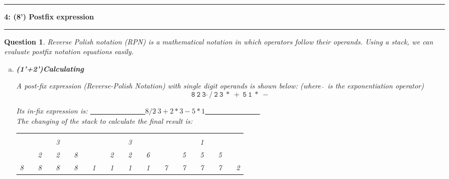 \documentclass{article}
\newcommand\question[2]{\vspace{.25in}\hrule\textbf{#1: #2}\vspace{.5em}\hrule\vspace{.10in}}
\newtheorem{Q}{Question}
\begin{document}
\question{4}{(8') Postfix expression}
\begin{Q}
	Reverse Polish notation (RPN) is a mathematical notation in which operators follow their operands. Using a stack, we can evaluate postfix notation equations easily.

	\begin{enumerate}[(a)]
		\item \textbf{(1'+2')Calculating}

		      A post-fix expression (Reverse-Polish Notation) with single digit operands is shown below: (where $\hat\ $ is the exponentiation operator)\\
		      $$\mathtt{8\ 2\ 3\ \hat \ /\ 2\ 3\ *\ +\ 5\ 1\ *\ -}$$


		      Its in-fix expression is: \underline{~~~~~~~~~~~~~~~$8/2\hat\ 3+2*3-5*1$~~~~~~~~~~~~~~~}\\
		      The changing of the stack to calculate the final result is:
		      \begin{table}[htb]
			      \centering\begin{tabular}{|l|l|l|l|l|l|l|l|l|l|l|l|l|l|l|l|l|l|l|l|l|l|l|l|l|}
				      \cline{1-1} \cline{3-3} \cline{5-5} \cline{7-7} \cline{9-9} \cline{11-11} \cline{13-13} \cline{15-15} \cline{17-17} \cline{19-19} \cline{21-21} \cline{23-23} \cline{25-25}
				        &  &   &  &   &  &   &  &   &  &   &  &   &  &   &  &   &  &   &  &   &  &   &  &   \\ \cline{1-1} \cline{3-3} \cline{5-5} \cline{7-7} \cline{9-9} \cline{11-11} \cline{13-13} \cline{15-15} \cline{17-17} \cline{19-19} \cline{21-21} \cline{23-23} \cline{25-25}
				        &  &   &  & 3 &  &   &  &   &  &   &  & 3 &  &   &  &   &  &   &  & 1 &  &   &  &   \\ \cline{1-1} \cline{3-3} \cline{5-5} \cline{7-7} \cline{9-9} \cline{11-11} \cline{13-13} \cline{15-15} \cline{17-17} \cline{19-19} \cline{21-21} \cline{23-23} \cline{25-25}
				        &  & 2 &  & 2 &  & 8 &  &   &  & 2 &  & 2 &  & 6 &  &   &  & 5 &  & 5 &  & 5 &  &   \\ \cline{1-1} \cline{3-3} \cline{5-5} \cline{7-7} \cline{9-9} \cline{11-11} \cline{13-13} \cline{15-15} \cline{17-17} \cline{19-19} \cline{21-21} \cline{23-23} \cline{25-25}
				      8 &  & 8 &  & 8 &  & 8 &  & 1 &  & 1 &  & 1 &  & 1 &  & 7 &  & 7 &  & 7 &  & 7 &  & 2 \\ \cline{1-1} \cline{3-3} \cline{5-5} \cline{7-7} \cline{9-9} \cline{11-11} \cline{13-13} \cline{15-15} \cline{17-17} \cline{19-19} \cline{21-21} \cline{23-23} \cline{25-25}
			      \end{tabular}
		      \end{table}


\end{enumerate}
\end{Q}
\end{document}
